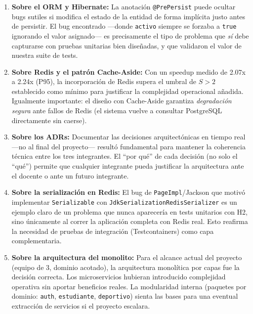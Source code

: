 \documentclass[12pt]{article}
\begin{document}
	\begin{enumerate}
		
		\item \textbf{Sobre el ORM y Hibernate:} La anotación \texttt{@PrePersist} puede ocultar bugs sutiles si modifica el estado de la entidad de forma implícita justo antes de persistir. El bug encontrado —donde \texttt{activo} siempre se forzaba a \texttt{true} ignorando el valor asignado— es precisamente el tipo de problema que \textit{sí} debe capturarse con pruebas unitarias bien diseñadas, y que validaron el valor de nuestra suite de tests.
		
		\item \textbf{Sobre Redis y el patrón Cache-Aside:} Con un speedup medido de 2.07x a 2.24x (P95), la incorporación de Redis supera el umbral de $S > 2$ establecido como mínimo para justificar la complejidad operacional añadida. Igualmente importante: el diseño con Cache-Aside garantiza \textit{degradación segura} ante fallos de Redis (el sistema vuelve a consultar PostgreSQL directamente sin caerse).
		
		\item \textbf{Sobre los ADRs:} Documentar las decisiones arquitectónicas en tiempo real —no al final del proyecto— resultó fundamental para mantener la coherencia técnica entre los tres integrantes. El ``por qué'' de cada decisión (no solo el ``qué'') permite que cualquier integrante pueda justificar la arquitectura ante el docente o ante un futuro integrante.
		
		\item \textbf{Sobre la serialización en Redis:} El bug de \texttt{PageImpl}/Jackson que motivó implementar \texttt{Serializable} con \texttt{JdkSerializationRedisSerializer} es un ejemplo claro de un problema que nunca aparecería en tests unitarios con H2, sino únicamente al correr la aplicación completa con Redis real. Esto reafirma la necesidad de pruebas de integración (Testcontainers) como capa complementaria.
		
		\item \textbf{Sobre la arquitectura del monolito:} Para el alcance actual del proyecto (equipo de 3, dominio acotado), la arquitectura monolítica por capas fue la decisión correcta. Los microservicios hubieran introducido complejidad operativa sin aportar beneficios reales. La modularidad interna (paquetes por dominio: \texttt{auth}, \texttt{estudiante}, \texttt{deportivo}) sienta las bases para una eventual extracción de servicios si el proyecto escalara.
		
	\end{enumerate}
	
\end{document}
